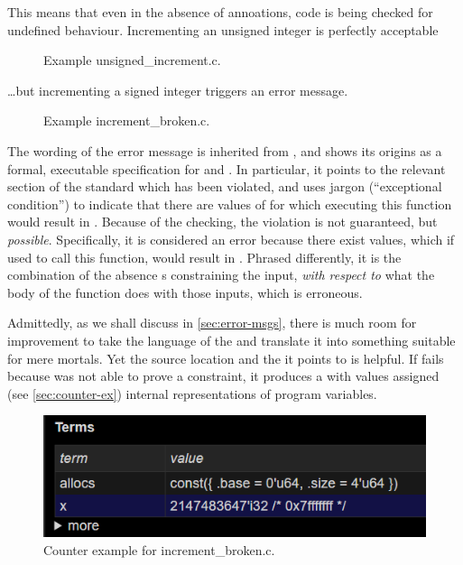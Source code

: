 This means that even in the absence of annoations, code is being checked for
undefined behaviour. Incrementing an unsigned integer is perfectly acceptable
\begin{figure}[h]
\centering
{}
\caption{Example unsigned\_increment.c.}\label{fig:un-incr}
\end{figure}%

\ldots but incrementing a signed integer triggers an error message.%

\begin{figure}[h]
    \centering
    \caption{Example increment\_broken.c.}\label{fig:incr-broken}
\end{figure}

The wording of the error message is inherited from , and shows its
origins as a formal, executable specification for  and 
. In particular, it points to the relevant section of the standard which
has been violated, and uses jargon (``exceptional condition'') to indicate that
there are values of  for which executing this function would result
in . Because of the  checking, the violation is not
guaranteed, but \emph{possible}. Specifically, it is considered an error
because there exist values, which if used to call this function, would result
in . Phrased differently, it is the combination of the absence
s constraining the input, \emph{with respect to} what the body
of the function does with those inputs, which is erroneous.

Admittedly, as we shall discuss in \cref{sec:error-msgs}, there is much room
for improvement to take the language of the  and
translate it into something suitable for mere mortals. Yet the source location
and the  it points to is helpful. If  fails
because  was not able to prove a constraint, it produces a
 with values assigned (see \cref{sec:counter-ex})
internal representations of program variables.

\begin{figure}[h]
    \centering
    \includegraphics[width=.8\textwidth]{figures/increment_broken_state.png}
    \caption{Counter example for increment\_broken.c.}\label{fig:incr-broken-counter-ex}
\end{figure}

